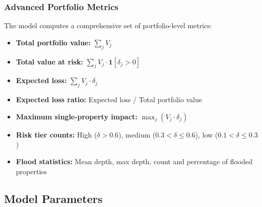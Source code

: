 \documentclass[11pt,a4paper]{article}
\begin{document}
\subsubsection{Advanced Portfolio Metrics}

The model computes a comprehensive set of portfolio-level metrics:

\begin{itemize}[nosep]
    \item \textbf{Total portfolio value:} $\sum_j V_j$
    \item \textbf{Total value at risk:} $\sum_j V_j \cdot \mathbf{1}[\delta_j > 0]$
    \item \textbf{Expected loss:} $\sum_j V_j \cdot \delta_j$
    \item \textbf{Expected loss ratio:} Expected loss / Total portfolio value
    \item \textbf{Maximum single-property impact:} $\max_j (V_j \cdot \delta_j)$
    \item \textbf{Risk tier counts:} High ($\delta > 0.6$), medium ($0.3 < \delta \leq 0.6$),
          low ($0.1 < \delta \leq 0.3$)
    \item \textbf{Flood statistics:} Mean depth, max depth, count and percentage of
          flooded properties
\end{itemize}

\mkminputs

\subsection{Model Parameters}
\end{document}
